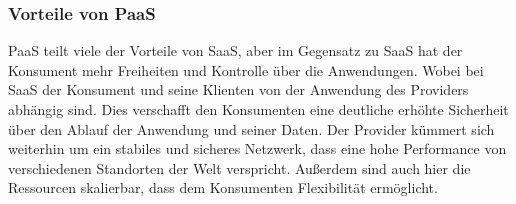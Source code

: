 \subsubsection*{Vorteile von PaaS}

PaaS teilt viele der Vorteile von SaaS, aber im Gegensatz zu SaaS hat der Konsument mehr Freiheiten und Kontrolle über die Anwendungen.
Wobei bei SaaS der Konsument und seine Klienten von der Anwendung des Providers abhängig sind. Dies verschafft den Konsumenten eine deutliche erhöhte Sicherheit über den Ablauf
der Anwendung und seiner Daten.
Der Provider kümmert sich weiterhin um ein stabiles und sicheres Netzwerk, dass eine hohe Performance von verschiedenen Standorten der Welt verspricht.
Außerdem sind auch hier die Ressourcen skalierbar, dass dem Konsumenten Flexibilität ermöglicht. 


